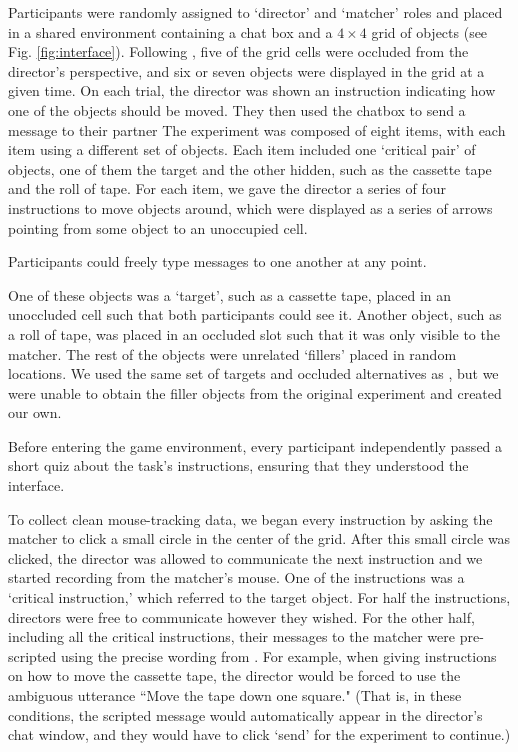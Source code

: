 \documentclass[manuscript]{stjour}
\begin{document}
Participants were randomly assigned to `director' and `matcher' roles and placed in a shared environment containing a chat box and a $4 \times 4$ grid of objects (see Fig. \ref{fig:interface}). Following \cite{KeysarLinBarr03_LimitsOnTheoryOfMindUse}, five of the grid cells were occluded from the director's perspective, and six or seven objects were displayed in the grid at a given time. On each trial, the director was shown an instruction indicating how one of the objects should be moved. They then used the chatbox to send a message to their partner  The experiment was composed of eight items, with each item using a different set of objects. Each item included one `critical pair' of objects, one of them the target and the other hidden, such as the cassette tape and the roll of tape. For each item, we gave the director a series of four instructions to move objects around, which were displayed as a series of arrows pointing from some object to an unoccupied cell. 


Participants could freely type messages to one another at any point. 

One of these objects was a `target', such as a cassette tape, placed in an unoccluded cell such that both participants could see it. Another object, such as a roll of tape, was placed in an occluded slot such that it was only visible to the matcher. The rest of the objects were unrelated `fillers' placed in random locations. We used the same set of targets and occluded alternatives as \cite{KeysarLinBarr03_LimitsOnTheoryOfMindUse}, but we were unable to obtain the filler objects from the original experiment and created our own.


Before entering the game environment, every participant independently passed a short quiz about the task's instructions, ensuring that they understood the interface. %

To collect clean mouse-tracking data, we began every instruction by asking the matcher to click a small circle in the center of the grid. After this small circle was clicked, the director was allowed to communicate the next instruction and we started recording from the matcher's mouse. 
One of the instructions was a `critical instruction,' which referred to the target object.
For half the instructions, directors were free to communicate however they wished. For the other half, including all the critical instructions, their messages to the matcher were pre-scripted using the precise wording from \cite{KeysarLinBarr03_LimitsOnTheoryOfMindUse}. For example, when giving instructions on how to move the cassette tape, the director would be forced to use the ambiguous utterance ``Move the tape down one square." (That is, in these conditions, the scripted message would automatically appear in the director's chat window, and they would have to click `send' for the experiment to continue.)
\end{document}
